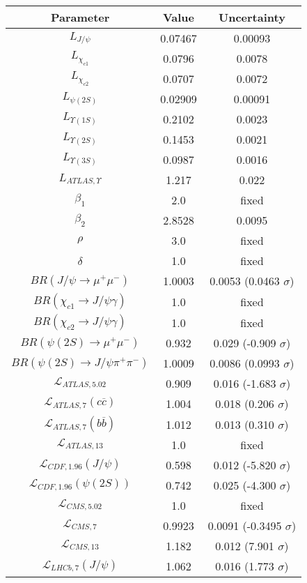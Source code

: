 \begin{table}[h!]
\centering
\begin{tabular}{c|c|c}
Parameter & Value & Uncertainty \\
\hline
$L_{J/\psi}$ & 0.07467 & 0.00093 \\
$L_{\chi_{c1}}$ & 0.0796 & 0.0078 \\
$L_{\chi_{c2}}$ & 0.0707 & 0.0072 \\
$L_{\psi(2S)}$ & 0.02909 & 0.00091 \\
$L_{\Upsilon(1S)}$ & 0.2102 & 0.0023 \\
$L_{\Upsilon(2S)}$ & 0.1453 & 0.0021 \\
$L_{\Upsilon(3S)}$ & 0.0987 & 0.0016 \\
$L_{ATLAS,\Upsilon}$ & 1.217 & 0.022 \\
$\beta_1$ & 2.0 & fixed \\
$\beta_2$ & 2.8528 & 0.0095 \\
$\rho$ & 3.0 & fixed \\
$\delta$ & 1.0 & fixed \\
$BR(J/\psi\rightarrow\mu^+\mu^-)$ & 1.0003 & 0.0053 (0.0463 $\sigma$) \\
$BR(\chi_{c1}\rightarrow J/\psi\gamma)$ & 1.0 & fixed \\
$BR(\chi_{c2}\rightarrow J/\psi\gamma)$ & 1.0 & fixed \\
$BR(\psi(2S)\rightarrow\mu^+\mu^-)$ & 0.932 & 0.029 (-0.909 $\sigma$) \\
$BR(\psi(2S)\rightarrow J/\psi\pi^+\pi^-)$ & 1.0009 & 0.0086 (0.0993 $\sigma$) \\
$\mathcal L_{ATLAS,5.02}$ & 0.909 & 0.016 (-1.683 $\sigma$) \\
$\mathcal L_{ATLAS,7}(c\overline c)$ & 1.004 & 0.018 (0.206 $\sigma$) \\
$\mathcal L_{ATLAS,7}(b\overline b)$ & 1.012 & 0.013 (0.310 $\sigma$) \\
$\mathcal L_{ATLAS,13}$ & 1.0 & fixed \\
$\mathcal L_{CDF,1.96}(J/\psi)$ & 0.598 & 0.012 (-5.820 $\sigma$) \\
$\mathcal L_{CDF,1.96}(\psi(2S))$ & 0.742 & 0.025 (-4.300 $\sigma$) \\
$\mathcal L_{CMS,5.02}$ & 1.0 & fixed \\
$\mathcal L_{CMS,7}$ & 0.9923 & 0.0091 (-0.3495 $\sigma$) \\
$\mathcal L_{CMS,13}$ & 1.182 & 0.012 (7.901 $\sigma$) \\
$\mathcal L_{LHCb,7}(J/\psi)$ & 1.062 & 0.016 (1.773 $\sigma$) \\

\end{tabular}
\end{table}
